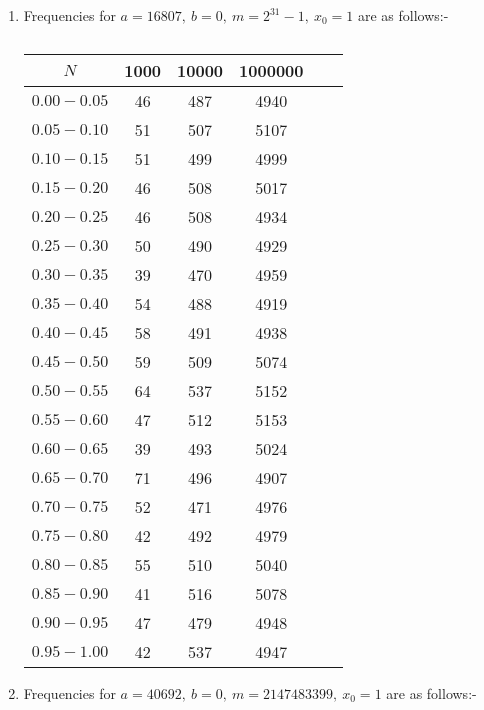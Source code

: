\documentclass[10pt]{article}
\begin{document}
\begin{enumerate}

\item Frequencies for $a = 16807 ,\:  b = 0, \: m = 2^{31}-1,\: x_0 = 1$ are as follows:- 

\begin{table}[H]
\begin{center}
\begin{tabular}{|c|c|c|c|c|c|}
\hline
$N$ & 1000  & 10000 & 1000000\\
\hline
$0.00-0.05$ & 46 & 487 & 4940\\
\hline
$0.05-0.10$ & 51 & 507 & 5107 \\
\hline
$0.10-0.15$ & 51 & 499 & 4999 \\
\hline
$0.15-0.20$ & 46 & 508 & 5017\\
\hline
$0.20-0.25$ & 46 & 508 & 4934 \\
\hline
$0.25-0.30$ & 50 & 490 & 4929\\
\hline
$0.30-0.35$ & 39 & 470 & 4959\\
\hline
$0.35-0.40$ & 54 & 488 & 4919\\
\hline
$0.40-0.45$ & 58 & 491 & 4938 \\
\hline
$0.45-0.50$ & 59 & 509 & 5074\\
\hline
$0.50-0.55$ & 64 & 537 & 5152\\
\hline
$0.55-0.60$ & 47 & 512 & 5153 \\
\hline
$0.60-0.65$ & 39 & 493 & 5024 \\
\hline
$0.65-0.70$ & 71 & 496 & 4907\\
\hline
$0.70-0.75$ & 52 & 471 & 4976 \\
\hline
$0.75-0.80$ & 42 & 492 & 4979 \\
\hline
$0.80-0.85$ & 55 & 510 & 5040\\
\hline
$0.85-0.90$ & 41 & 516 & 5078 \\
\hline
$0.90-0.95$ & 47 & 479 & 4948 \\
\hline
$0.95-1.00$ & 42 & 537  & 4947 \\
\hline
\end{tabular}
\end{center}
\caption{}
\label{tab:q2_seq1}
\end{table}
\medskip
\item Frequencies for $a = 40692 ,\: b = 0, \: m = 2147483399 ,\: x_0 = 1$ are as follows:- 


\end{enumerate}
\end{document}

